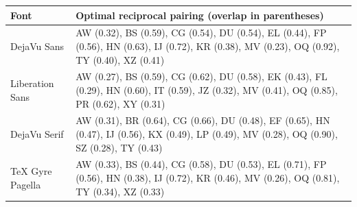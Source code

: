 \begin{tabular}{lp{9.2cm}}
\toprule
Font & Optimal reciprocal pairing (overlap in parentheses)\\
\midrule
DejaVu Sans & AW (0.32), BS (0.59), CG (0.54), DU (0.54), EL (0.44), FP (0.56), HN (0.63), IJ (0.72), KR (0.38), MV (0.23), OQ (0.92), TY (0.40), XZ (0.41)\\
Liberation Sans & AW (0.27), BS (0.59), CG (0.62), DU (0.58), EK (0.43), FL (0.29), HN (0.60), IT (0.59), JZ (0.32), MV (0.41), OQ (0.85), PR (0.62), XY (0.31)\\
DejaVu Serif & AW (0.31), BR (0.64), CG (0.66), DU (0.48), EF (0.65), HN (0.47), IJ (0.56), KX (0.49), LP (0.49), MV (0.28), OQ (0.90), SZ (0.28), TY (0.43)\\
TeX Gyre Pagella & AW (0.33), BS (0.44), CG (0.58), DU (0.53), EL (0.71), FP (0.56), HN (0.38), IJ (0.72), KR (0.46), MV (0.26), OQ (0.81), TY (0.34), XZ (0.33)\\
\bottomrule
\end{tabular}
